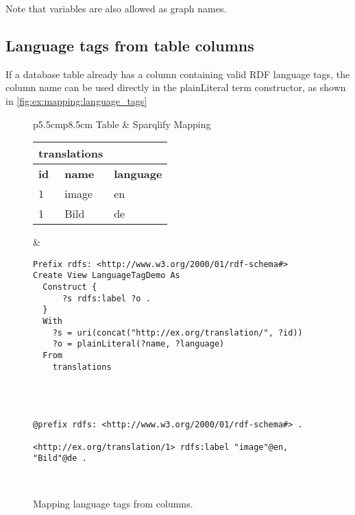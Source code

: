 \documentclass[a4paper,twoside,bibtotoc,abstracton,12pt,BCOR=15mm]{scrreprt}
\begin{document}
Note that variables are also allowed as graph names.

\newpage
\subsection{Language tags from table columns}
If a database table already has a column containing valid RDF language tags, the column name can be used directly in the plainLiteral term constructor,
as shown in \autoref{fig:ex:mapping:language_tags}
\begin{figure}[!h]
\centering
\begin{tabular}{p{5.5cm}p{8.5cm}}
\toprule
Table & Sparqlify Mapping \\ 
\midrule

\begin{tabular}{|l|l|l|} \cline{1-2}
\multicolumn{2}{|c|}{translations} \\ \hline
\textbf{id} & \textbf{name} & \textbf{language} \\ \hline
1 & image & en \\ \hline
1 & Bild & de \\ \hline
\end{tabular}

&

\begin{minipage}{8.5cm}
\begin{scriptsize}
\begin{verbatim}
Prefix rdfs: <http://www.w3.org/2000/01/rdf-schema#>
Create View LanguageTagDemo As
  Construct {
      ?s rdfs:label ?o .
  }
  With
    ?s = uri(concat("http://ex.org/translation/", ?id))
    ?o = plainLiteral(?name, ?language)
  From
    translations
\end{verbatim}
\end{scriptsize}
\end{minipage}


\\

 \\ \midrule
\begin{minipage}{\textwidth}
\begin{lstlisting}
@prefix rdfs: <http://www.w3.org/2000/01/rdf-schema#> .

<http://ex.org/translation/1> rdfs:label "image"@en, "Bild"@de .
\end{lstlisting}
\end{minipage}


\\
\bottomrule
\end{tabular}
\caption{Mapping language tags from columns.}
\label{fig:ex:mapping:language_tags}
\end{figure}
\end{document}
